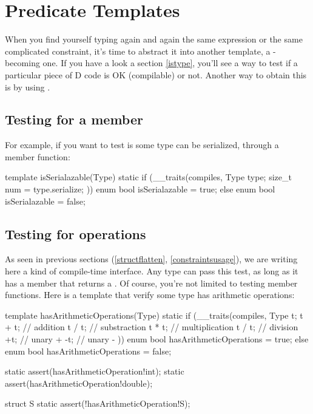 \section{Predicate Templates}\label{predicates}

When you find yourself typing again and again the same  expression or the same complicated constraint, it's time to abstract it into another template, a -becoming one. If you have a look a section \ref{istype}, you'll see a way to test if a particular piece of D code is OK (compilable) or not. Another way to obtain this is by using .

\subsection{Testing for a member}

For example, if you want to test is some type can be serialized, through a  member function:

\begin{dcode}
template isSerialazable(Type)
{
    static if (__traits(compiles, {
                                   Type type;
                                   size_t num = type.serialize;
                                  }))
        enum bool isSerialazable = true;
    else
        enum bool isSerialazable = false;
}
\end{dcode}

\subsection{Testing for operations}

As seen in previous sections (\ref{structflatten}, \ref{constraintsusage}), we are writing here a kind of compile-time interface. Any type can pass this test, as long as it has a  member that returns a . Of course, you're not limited to testing member functions. Here is a template that verify some type has arithmetic operations:

\begin{dcode}
template hasArithmeticOperations(Type)
{
    static if (__traits(compiles, 
                       {   
                           Type t;
                           t + t; // addition
                           t / t; // substraction
                           t * t; // multiplication
                           t / t; // division
                           +t;    // unary +
                           -t;    // unary -
                       }))
        enum bool hasArithmeticOperations = true;
    else
        enum bool hasArithmeticOperations = false;
}

static assert(hasArithmeticOperation!int);
static assert(hasArithmeticOperation!double);

struct S {}
static assert(!hasArithmeticOperation!S);
\end{dcode}

